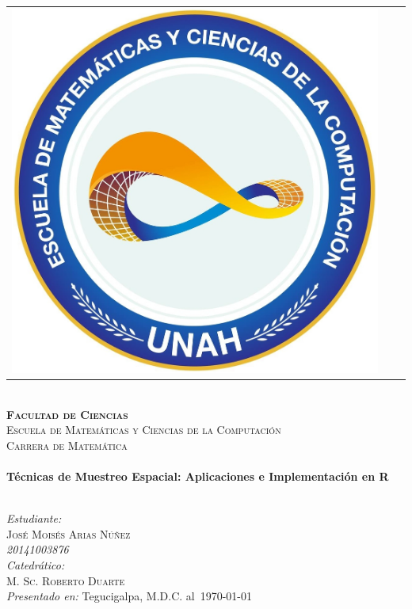 \documentclass[14pt]{extarticle}
\begin{document}
\begin{titlepage}
\begin{tabular}{llr}
\begin{minipage}{2cm}
		\includegraphics[scale=0.08]{logo2_001.jpg}	
	\end{minipage}
\end{tabular} \\[0.5cm]
 
\textsc{\Large \textbf{Facultad de Ciencias}}\\ 
\textsc{Escuela de Matemáticas y Ciencias de la Computación}\\[0.5cm]
\textsc{\small Carrera de Matemática}\\[2.cm]

\HRule \\[0.2cm]
{ \huge\bfseries Técnicas de Muestreo Espacial: Aplicaciones e Implementación en R\\[0.2cm] 
\HRule \\[3cm]}

\emph{Estudiante:}\\
\textsc{José Moisés Arias Núñez}\\
\textit{20141003876}\\[0.4cm]

\emph{Catedrático:}\\
\textsc{M. Sc. Roberto Duarte}\\[0.4cm]

{\emph{Presentado en:} Tegucigalpa, M.D.C. al\ \today}\\[0cm]

\end{titlepage}
\newpage
\tableofcontents
\end{document}
